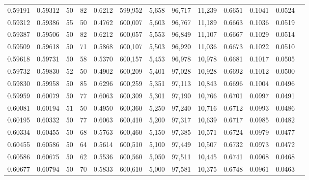 \begin{tabular}{rrrrrrrrrrrrr}
0.59191 & 0.59312 &    50 &  82 &                                     0.6212 & 599,952 &   5,658 &  96,717 &  11,239 & 0.6651 & 0.1041 & 0.0524 \\
0.59312 & 0.59386 &    55 &  50 &                                     0.4762 & 600,007 &   5,603 &  96,767 &  11,189 & 0.6663 & 0.1036 & 0.0519 \\
0.59387 & 0.59506 &    50 &  82 &                                     0.6212 & 600,057 &   5,553 &  96,849 &  11,107 & 0.6667 & 0.1029 & 0.0514 \\
0.59509 & 0.59618 &    50 &  71 &                                     0.5868 & 600,107 &   5,503 &  96,920 &  11,036 & 0.6673 & 0.1022 & 0.0510 \\
0.59618 & 0.59731 &    50 &  58 &                                     0.5370 & 600,157 &   5,453 &  96,978 &  10,978 & 0.6681 & 0.1017 & 0.0505 \\
0.59732 & 0.59830 &    52 &  50 &                                     0.4902 & 600,209 &   5,401 &  97,028 &  10,928 & 0.6692 & 0.1012 & 0.0500 \\
0.59830 & 0.59958 &    50 &  85 &                                     0.6296 & 600,259 &   5,351 &  97,113 &  10,843 & 0.6696 & 0.1004 & 0.0496 \\
0.59959 & 0.60079 &    50 &  77 &                                     0.6063 & 600,309 &   5,301 &  97,190 &  10,766 & 0.6701 & 0.0997 & 0.0491 \\
0.60081 & 0.60194 &    51 &  50 &                                     0.4950 & 600,360 &   5,250 &  97,240 &  10,716 & 0.6712 & 0.0993 & 0.0486 \\
0.60195 & 0.60332 &    50 &  77 &                                     0.6063 & 600,410 &   5,200 &  97,317 &  10,639 & 0.6717 & 0.0985 & 0.0482 \\
0.60334 & 0.60455 &    50 &  68 &                                     0.5763 & 600,460 &   5,150 &  97,385 &  10,571 & 0.6724 & 0.0979 & 0.0477 \\
0.60455 & 0.60586 &    50 &  64 &                                     0.5614 & 600,510 &   5,100 &  97,449 &  10,507 & 0.6732 & 0.0973 & 0.0472 \\
0.60586 & 0.60675 &    50 &  62 &                                     0.5536 & 600,560 &   5,050 &  97,511 &  10,445 & 0.6741 & 0.0968 & 0.0468 \\
0.60677 & 0.60794 &    50 &  70 &                                     0.5833 & 600,610 &   5,000 &  97,581 &  10,375 & 0.6748 & 0.0961 & 0.0463 \\

\end{tabular}
